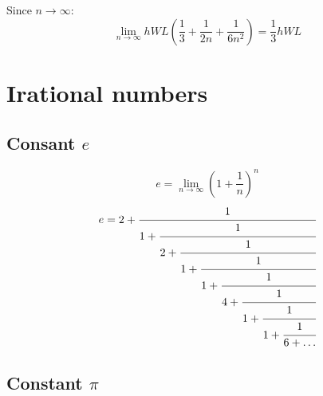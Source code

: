 Since $n\to\infty$:
\begin{equation*}
  \lim_{n\to\infty} hWL\left(\frac{1}{3}+\frac{1}{2n}+\frac{1}{6n^2}\right) = \frac{1}{3}hWL
\end{equation*}


\section{Irational numbers}
\subsection{Consant $e$}
\begin{equation*}
  e = \lim_{n\to\infty} \left( 1 + \frac{1}{n} \right)^n
\end{equation*}
\begin{equation*}
  e = 2 + \cfrac{1}{1+\cfrac{1}{2+\cfrac{1}{1+\cfrac{1}{1+\cfrac{1}{4+\cfrac{1}{1+\cfrac{1}{1+\cfrac{1}{6+\ldots}}}}}}}}
\end{equation*}



\subsection{Constant $\pi$}
